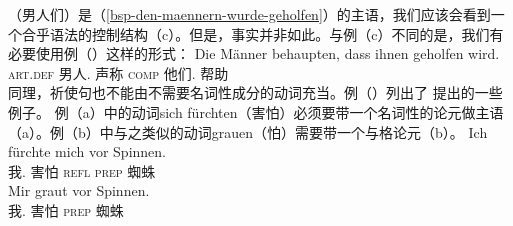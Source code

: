 （男人们）是（\ref{bsp-den-maennern-wurde-geholfen}）的主语，我们应该会看到一个合乎语法的控制结构（c）。但是，事实并非如此。与例（c）不同的是，我们有必要使用例（）这样的形式：
\ea
\gll Die Männer behaupten, dass ihnen geholfen wird.\\
	 \textsc{art}.\textsc{def} 男人.\nom{} 声称 \textsc{comp} 他们.\dat{} 帮助 \passiveprs\\
\z
%
同理，祈使句也不能由不需要名词性成分的动词充当。例（）列出了 \citet[]{Reis82}提出的一些例子。
\addlines[2]
\eal
{}
\zl
例（a）中的动词sich fürchten（害怕）必须要带一个名词性的论元做主语（a）。例（b）中与之类似的动词grauen（怕）需要带一个与格论元（b）。
\eal
\ex
\gll Ich fürchte mich vor Spinnen.\\
	 我.\nom{} 害怕 \textsc{refl} \textsc{prep} 蜘蛛\\
\ex 
\gll Mir graut vor Spinnen.\\
	 我.\dat{} 害怕 \textsc{prep} 蜘蛛\\
\zl

